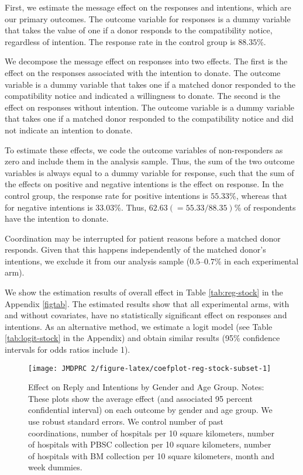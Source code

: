 \documentclass[12pt, a4paper]{article}
\begin{document}
First, we estimate the message effect on the responses and intentions, which are our primary outcomes. The outcome variable for responses is a dummy variable that takes the value of one if a donor responds to the compatibility notice, regardless of intention. The response rate in the control group is \(88.35\)\%.

We decompose the message effect on responses into two effects. The first is the effect on the responses associated with the intention to donate. The outcome variable is a dummy variable that takes one if a matched donor responded to the compatibility notice and indicated a willingness to donate. The second is the effect on responses without intention. The outcome variable is a dummy variable that takes one if a matched donor responded to the compatibility notice and did not indicate an intention to donate.

To estimate these effects, we code the outcome variables of non-responders as zero and include them in the analysis sample. Thus, the sum of the two outcome variables is always equal to a dummy variable for response, such that the sum of the effects on positive and negative intentions is the effect on response. In the control group, the response rate for positive intentions is \(55.33\)\%, whereas that for negative intentions is \(33.03\)\%. Thus, \(62.63(=55.33/88.35)\)\% of respondents have the intention to donate.

Coordination may be interrupted for patient reasons before a matched donor responds. Given that this happens independently of the matched donor's intentions, we exclude it from our analysis sample (\(0.5\)--\(0.7\)\% in each experimental arm).

We show the estimation results of overall effect in Table \ref{tab:reg-stock} in the Appendix \ref{figtab}. The estimated results show that all experimental arms, with and without covariates, have no statistically significant effect on responses and intentions. As an alternative method, we estimate a logit model (see Table \ref{tab:logit-stock} in the Appendix) and obtain similar results (95\% confidence intervals for odds ratios include 1).

\begin{figure}[t]
\texttt{[image: JMDPRC~2/figure-latex/coefplot-reg-stock-subset-1]} \caption{Effect on Reply and Intentions by Gender and Age Group. Notes: These plots show the average effect (and associated 95 percent confidential interval) on each outcome by gender and age group. We use robust standard errors. We control number of past coordinations, number of hospitals per 10 square kilometers, number of hospitals with PBSC collection per 10 square kilometers, number of hospitals with BM collection per 10 square kilometers, month and week dummies.}\label{fig:coefplot-reg-stock-subset}
\end{figure}
\end{document}
